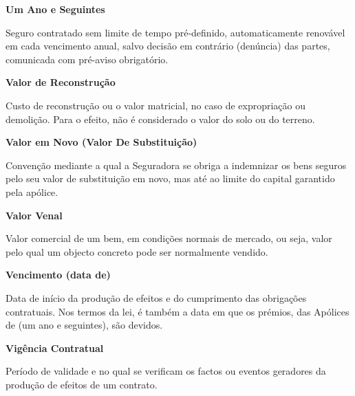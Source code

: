 \begin{description}
\item \textbf{Um Ano e Seguintes}

Seguro contratado sem limite de tempo pré-definido, automaticamente renovável em cada vencimento anual, salvo decisão em contrário (denúncia) das partes, comunicada com pré-aviso obrigatório.
\end{description}

\begin{description}
\item \textbf{Valor de Reconstrução}

Custo de reconstrução ou o valor matricial, no caso de expropriação ou demolição. Para o efeito, não é considerado o valor do solo ou do terreno.
\end{description}

\begin{description}
\item \textbf{Valor em Novo (Valor De Substituição)}

Convenção mediante a qual a Seguradora se obriga a indemnizar os bens seguros pelo seu valor de substituição em novo, mas até ao limite do capital garantido pela apólice.
\end{description}

\begin{description}
\item \textbf{Valor Venal}

Valor comercial de um bem, em condições normais de mercado, ou seja, valor pelo qual um objecto concreto pode ser normalmente vendido.
\end{description}

\begin{description}
\item \textbf{Vencimento (data de)}

Data de início da produção de efeitos e do cumprimento das obrigações contratuais. Nos termos da lei, é também a data em que os prémios, das Apólices de (um ano e seguintes), são devidos.
\end{description}

\begin{description}
\item \textbf{Vigência Contratual}

Período de validade e no qual se verificam os factos ou eventos geradores da produção de efeitos de um contrato.
\end{description}

